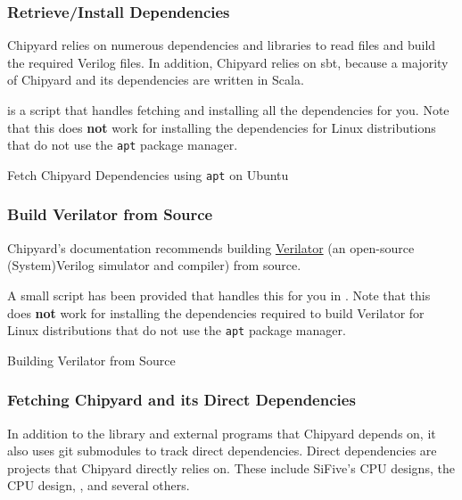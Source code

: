 \subsubsection{Retrieve/Install Dependencies}\label{sec:Retrive_Install_Dependencies}
Chipyard relies on numerous dependencies and libraries to read files and build the required Verilog files.
In addition, Chipyard relies on \gls{sbt}, because a majority of Chipyard and its dependencies are written in Scala.

 is a script that handles fetching and installing all the dependencies for you.
Note that this does \textbf{not} work for installing the dependencies for Linux distributions that do not use the \texttt{apt} package manager.

\begin{listing}[h!tbp]
\caption{Fetch Chipyard Dependencies using \texttt{apt} on Ubuntu}
\label{lst:Ubuntu_Chipyard_Deps_Setup}
\end{listing}

\subsubsection{Build Verilator from Source}\label{sec:Build_Verilator_from_Source}
Chipyard's documentation recommends building \href{https://www.veripool.org/wiki/verilator}{Verilator} (an open-source (System)Verilog simulator and compiler) from \gls{source}.

A small script has been provided that handles this for you in .
Note that this does \textbf{not} work for installing the dependencies required to build Verilator for Linux distributions that do not use the \texttt{apt} package manager.

\begin{listing}[h!tbp]
\caption{Building Verilator from Source}
\label{lst:Build_Verilator_from_Source}
\end{listing}

\subsubsection{Fetching Chipyard and its Direct Dependencies}\label{sec:Fetching_Chipyard_Direct_Dependencies}
In addition to the library and external programs that Chipyard depends on, it also uses git submodules to track direct dependencies.
Direct dependencies are projects that Chipyard directly relies on.
These include SiFive's CPU designs, the  CPU design, , and several others.

